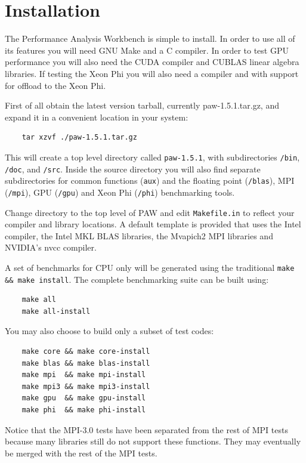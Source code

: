 \documentclass[10pt,a4paper]{report}
\begin{document}
\tableofcontents

\chapter{Installation}
The Performance Analysis Workbench is simple to install. In order to use all of its features you will need GNU Make and a C compiler. In order to test GPU performance you will also need the CUDA compiler and CUBLAS linear algebra libraries. If testing the Xeon Phi you will also need a compiler and with support for offload to the Xeon Phi.

First of all obtain the latest version tarball, currently paw-1.5.1.tar.gz, and expand it in a convenient location in your system:

\begin{verbatim}
    tar xzvf ./paw-1.5.1.tar.gz
\end{verbatim}

This will create a top level directory called \verb+paw-1.5.1+, with subdirectories \verb+/bin+, \verb+/doc+, and \verb+/src+. Inside the source directory you will also find separate subdirectories for common functions (\verb+aux+) and the floating point (\verb+/blas+), MPI (\verb+/mpi+), GPU (\verb+/gpu+) and Xeon Phi (\verb+/phi+) benchmarking tools.

Change directory to the top level of PAW and edit \verb+Makefile.in+ to reflect your compiler and library locations. A default template is provided that uses the Intel compiler, the Intel MKL BLAS libraries, the Mvapich2 MPI libraries and NVIDIA's nvcc compiler.

A set of benchmarks for CPU only will be generated using the traditional \texttt{make \&\& make install}. The complete benchmarking suite can be built using:

\begin{verbatim}
    make all
    make all-install
\end{verbatim}

You may also choose to build only a subset of test codes:

\begin{verbatim}
    make core && make core-install
    make blas && make blas-install
    make mpi  && make mpi-install
    make mpi3 && make mpi3-install
    make gpu  && make gpu-install
    make phi  && make phi-install
\end{verbatim}

Notice that the MPI-3.0 tests have been separated from the rest of MPI tests because many libraries still do not support these functions. They may eventually be merged with the rest of the MPI tests.
\end{document}
